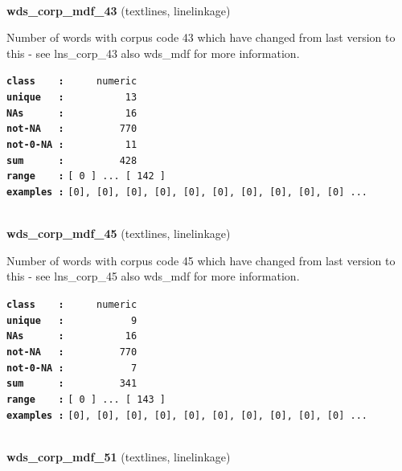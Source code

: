 \documentclass[]{article}
\begin{document}
~

\textbf{wds\_corp\_mdf\_43} (textlines, linelinkage)

Number of words with corpus code 43 which have changed from last version
to this - see lns\_corp\_43 also wds\_mdf for more information.

\textbf{\texttt{class\ \ \ \ :}} \texttt{~~~~~numeric}\\
\textbf{\texttt{unique\ \ \ :}} \texttt{~~~~~~~~~~13}\\
\textbf{\texttt{NAs\ \ \ \ \ \ :}} \texttt{~~~~~~~~~~16}\\
\textbf{\texttt{not-NA\ \ \ :}} \texttt{~~~~~~~~~770}\\
\textbf{\texttt{not-0-NA\ :}} \texttt{~~~~~~~~~~11}\\
\textbf{\texttt{sum\ \ \ \ \ \ :}} \texttt{~~~~~~~~~428}\\
\textbf{\texttt{range\ \ \ \ :}}
\texttt{{[}\ 0\ {]}\ ...\ {[}\ 142\ {]}}\\
\textbf{\texttt{examples\ :}}
\texttt{{[}0{]},\ {[}0{]},\ {[}0{]},\ {[}0{]},\ {[}0{]},\ {[}0{]},\ {[}0{]},\ {[}0{]},\ {[}0{]},\ {[}0{]}\ ...}\\

~

\textbf{wds\_corp\_mdf\_45} (textlines, linelinkage)

Number of words with corpus code 45 which have changed from last version
to this - see lns\_corp\_45 also wds\_mdf for more information.

\textbf{\texttt{class\ \ \ \ :}} \texttt{~~~~~numeric}\\
\textbf{\texttt{unique\ \ \ :}} \texttt{~~~~~~~~~~~9}\\
\textbf{\texttt{NAs\ \ \ \ \ \ :}} \texttt{~~~~~~~~~~16}\\
\textbf{\texttt{not-NA\ \ \ :}} \texttt{~~~~~~~~~770}\\
\textbf{\texttt{not-0-NA\ :}} \texttt{~~~~~~~~~~~7}\\
\textbf{\texttt{sum\ \ \ \ \ \ :}} \texttt{~~~~~~~~~341}\\
\textbf{\texttt{range\ \ \ \ :}}
\texttt{{[}\ 0\ {]}\ ...\ {[}\ 143\ {]}}\\
\textbf{\texttt{examples\ :}}
\texttt{{[}0{]},\ {[}0{]},\ {[}0{]},\ {[}0{]},\ {[}0{]},\ {[}0{]},\ {[}0{]},\ {[}0{]},\ {[}0{]},\ {[}0{]}\ ...}\\

~

\textbf{wds\_corp\_mdf\_51} (textlines, linelinkage)
\end{document}
